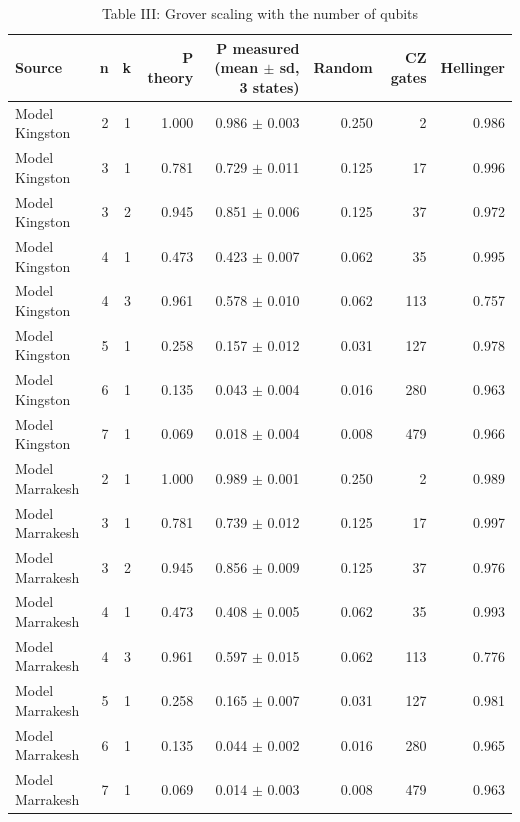 \begin{table}[t]
\centering
\small
\caption{Table III: Grover scaling with the number of qubits}
\label{tab:III}
\begin{tabular}{lrrrrrrr}
\toprule
Source & n & k & P theory & P measured (mean $\pm$ sd, 3 states) & Random & CZ gates & Hellinger \\
\midrule
Model Kingston & 2 & 1 & 1.000 & 0.986 $\pm$ 0.003 & 0.250 & 2 & 0.986 \\
Model Kingston & 3 & 1 & 0.781 & 0.729 $\pm$ 0.011 & 0.125 & 17 & 0.996 \\
Model Kingston & 3 & 2 & 0.945 & 0.851 $\pm$ 0.006 & 0.125 & 37 & 0.972 \\
Model Kingston & 4 & 1 & 0.473 & 0.423 $\pm$ 0.007 & 0.062 & 35 & 0.995 \\
Model Kingston & 4 & 3 & 0.961 & 0.578 $\pm$ 0.010 & 0.062 & 113 & 0.757 \\
Model Kingston & 5 & 1 & 0.258 & 0.157 $\pm$ 0.012 & 0.031 & 127 & 0.978 \\
Model Kingston & 6 & 1 & 0.135 & 0.043 $\pm$ 0.004 & 0.016 & 280 & 0.963 \\
Model Kingston & 7 & 1 & 0.069 & 0.018 $\pm$ 0.004 & 0.008 & 479 & 0.966 \\
Model Marrakesh & 2 & 1 & 1.000 & 0.989 $\pm$ 0.001 & 0.250 & 2 & 0.989 \\
Model Marrakesh & 3 & 1 & 0.781 & 0.739 $\pm$ 0.012 & 0.125 & 17 & 0.997 \\
Model Marrakesh & 3 & 2 & 0.945 & 0.856 $\pm$ 0.009 & 0.125 & 37 & 0.976 \\
Model Marrakesh & 4 & 1 & 0.473 & 0.408 $\pm$ 0.005 & 0.062 & 35 & 0.993 \\
Model Marrakesh & 4 & 3 & 0.961 & 0.597 $\pm$ 0.015 & 0.062 & 113 & 0.776 \\
Model Marrakesh & 5 & 1 & 0.258 & 0.165 $\pm$ 0.007 & 0.031 & 127 & 0.981 \\
Model Marrakesh & 6 & 1 & 0.135 & 0.044 $\pm$ 0.002 & 0.016 & 280 & 0.965 \\
Model Marrakesh & 7 & 1 & 0.069 & 0.014 $\pm$ 0.003 & 0.008 & 479 & 0.963 \\
\bottomrule
\end{tabular}
\end{table}
